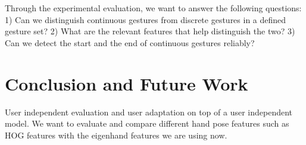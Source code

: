 \documentclass[10pt,twocolumn,letterpaper]{article}
\begin{document}
Through the experimental evaluation, we want to answer the following questions: 1) Can we
distinguish continuous gestures from discrete gestures in a defined gesture set? 2) What are the relevant
features that help distinguish the two? 3) Can we detect the start and the end of 
continuous gestures reliably? 
  
\section{Conclusion and Future Work}
User independent evaluation and user adaptation on top of a user independent model.
We want to evaluate and compare different hand pose features such as HOG features 
with the eigenhand features we are using now.

{\small


}
\end{document}
